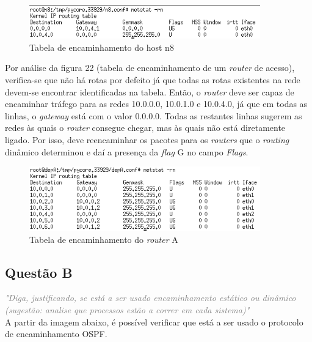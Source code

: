 \documentclass{llncs}
\newcommand{\questionE}[1]{\textcolor{gray}{\textit{"#1"}}}
\begin{document}
\begin{figure}[H]
\begin{center}
\includegraphics[width=10cm]{PARTEB_2a_tabelaN8.PNG}
\end{center}
\caption{Tabela de encaminhamento do host n8}
\end{figure}

Por análise da figura 22 (tabela de encaminhamento de um \textit{router} de acesso), verifica-se que não há rotas por defeito já que todas as rotas existentes na rede devem-se encontrar identificadas na tabela.
Então, o \textit{router} deve ser capaz de encaminhar tráfego para as redes 10.0.0.0, 10.0.1.0 e 10.0.4.0, já que em todas as linhas, o \textit{gateway} está com o valor 0.0.0.0.
Todas as restantes linhas sugerem as redes às quais o \textit{router} consegue chegar, mas às quais não está diretamente ligado. Por isso, deve reencaminhar os pacotes para os \textit{routers} que o \textit{routing} dinâmico determinou e daí a presença da \textit{flag} G no campo \textit{Flags}. 


\begin{figure}[H]
\begin{center}
\includegraphics[width=10cm]{PARTEB_2a_tabelaRouterA.PNG}
\end{center}
\caption{Tabela de encaminhamento do \textit{router} A}
\end{figure}

\subsection{Questão B}
\hspace{3mm}
\questionE{Diga, justificando, se está a ser usado encaminhamento estático ou dinâmico (sugestão: analise que processos estão a correr em cada sistema)}\\

A partir da imagem abaixo, é possível verificar que está a ser usado o protocolo de encaminhamento OSPF.
\end{document}
